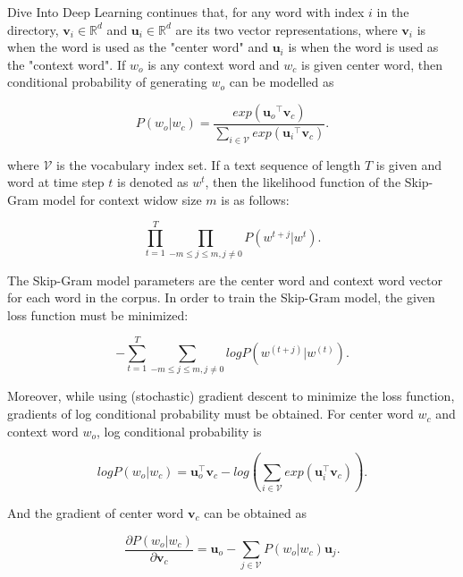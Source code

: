 \documentclass[man]{apa7}
\begin{document}
Dive Into Deep Learning continues that, for any word with index $\mathit{i}$ in the directory, $\mathbf{v_\mathit{i}} \in \mathbb{R}^d$ and $\mathbf{u_\mathit{i}} \in \mathbb{R}^d$ are its two vector representations, where $\mathbf{v_\mathit{i}}$ is when the word is used as the "center word" and $\mathbf{u_\mathit{i}}$ is when the word is used as the "context word". If $\mathit{w_o}$ is any context word and $\mathit{w_c}$ is given center word, then conditional probability of generating $\mathit{w_o}$ can be modelled as

\begin{equation}
P(w_o | w_c) = \frac{exp(\mathbf{u_\mathit{o}}^\top \mathbf{v_\mathit{c}})}{\sum_{i \in \mathcal{V}} exp(\mathbf{u_\mathit{i}}^\top \mathbf{v_\mathit{c}})}.
\end{equation}

where $ \mathcal{V}$ is the vocabulary index set. If a text sequence of length $T$ is given and word at time step $t$ is denoted as $\mathit{w}^t$, then the likelihood function of the Skip-Gram model for context widow size $m$ is as follows:

\begin{equation}
\prod_{t=1}^T \prod_{-m \le j \le m , j \neq 0} P(w^{t+j} | w^t).
\end{equation}

The Skip-Gram model parameters are the center word and context word vector for each word in the corpus. In order to train the Skip-Gram model, the given loss function must be minimized:

$$ -\sum_{t=1}^T \sum_{-m \le j \le m, j \neq 0} logP(w^{(t+j)} | w^{(t)}).$$

Moreover, while using (stochastic) gradient descent to minimize the loss function, gradients of log conditional probability must be obtained. For center word $w_c$ and context word $w_o$, log conditional probability is

\begin{equation}
logP(w_o|w_c) = \mathbf{u}_o^\top \mathbf{v}_c - log(\sum_{i \in \mathcal{V}} exp(\mathbf{u}_i^\top \mathbf{v}_c)).
\end{equation}

And the gradient of center word $\mathbf{v}_c$ can be obtained as

\begin{equation}
\frac{\partial P(w_o | w_c)}{\partial \mathbf{v}_c} = \mathbf{u}_o - \sum_{j \in \mathcal{V}} P(w_o|w_c)\mathbf{u}_j.
\end{equation}
\end{document}
